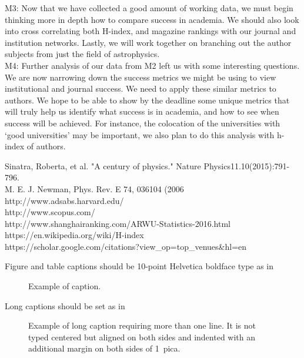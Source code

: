 \documentclass[times, 10pt,twocolumn]{article}
\begin{document}
M3: Now that we have collected a good amount of working data, we must begin thinking more in depth how to compare success in academia. We should also look into cross correlating both H-index, and magazine rankings with our journal and institution networks. Lastly, we will work together on branching out the author subjects from just the field of astrophysics. \\

M4: Further analysis of our data from M2 left us with some interesting questions. We are now narrowing down the success metrics we might be using to view institutional and journal success. We need to apply these similar metrics to authors. We hope to be able to show by the deadline some unique metrics that will truly help us identify what success is in academia, and how to see when success will be achieved. For instance, the colocation of the universities with ‘good universities’ may be important, we also plan to do this analysis with  h-index of authors.

\relax
 [1] Sinatra, Roberta, et al. "A century of physics." Nature Physics11.10(2015):791-796.\\
\relax
 [2] M. E. J. Newman, Phys. Rev. E 74, 036104 (2006\\
\relax
 [3] http://www.adsabs.harvard.edu/\\
\relax
 [4] http://www.scopus.com/\\
\relax
 [5] http://www.shanghairanking.com/ARWU-Statistics-2016.html\\
\relax
 [6] https://en.wikipedia.org/wiki/H-index\\
\relax
 [7] https://scholar.google.com/citations?view\_op=top\_venues\&hl=en\\


Figure and table captions should be 10-point 
Helvetica boldface type as in
\begin{figure}[h]
   \caption{Example of caption.}
\end{figure}

\noindent Long captions should be set as in 
\begin{figure}[h] 
   \caption{Example of long caption requiring more than one line. It is 
     not typed centered but aligned on both sides and indented with an 
     additional margin on both sides of 1~pica.}
\end{figure}
\end{document}
